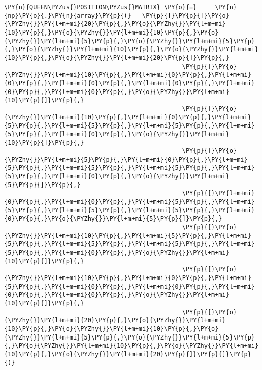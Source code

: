 \begin{Verbatim}[commandchars=\\\{\}]
         \PY{n}{QUEEN\PYZus{}POSITION\PYZus{}MATRIX} \PY{o}{=}     \PY{n}{np}\PY{o}{.}\PY{n}{array}\PY{p}{(}   \PY{p}{[}\PY{p}{[}\PY{o}{\PYZhy{}}\PY{l+m+mi}{20}\PY{p}{,}\PY{o}{\PYZhy{}}\PY{l+m+mi}{10}\PY{p}{,}\PY{o}{\PYZhy{}}\PY{l+m+mi}{10}\PY{p}{,}\PY{o}{\PYZhy{}}\PY{l+m+mi}{5}\PY{p}{,}\PY{o}{\PYZhy{}}\PY{l+m+mi}{5}\PY{p}{,}\PY{o}{\PYZhy{}}\PY{l+m+mi}{10}\PY{p}{,}\PY{o}{\PYZhy{}}\PY{l+m+mi}{10}\PY{p}{,}\PY{o}{\PYZhy{}}\PY{l+m+mi}{20}\PY{p}{]}\PY{p}{,}
                                                 \PY{p}{[}\PY{o}{\PYZhy{}}\PY{l+m+mi}{10}\PY{p}{,}\PY{l+m+mi}{0}\PY{p}{,}\PY{l+m+mi}{0}\PY{p}{,}\PY{l+m+mi}{0}\PY{p}{,}\PY{l+m+mi}{0}\PY{p}{,}\PY{l+m+mi}{0}\PY{p}{,}\PY{l+m+mi}{0}\PY{p}{,}\PY{o}{\PYZhy{}}\PY{l+m+mi}{10}\PY{p}{]}\PY{p}{,}
                                                 \PY{p}{[}\PY{o}{\PYZhy{}}\PY{l+m+mi}{10}\PY{p}{,}\PY{l+m+mi}{0}\PY{p}{,}\PY{l+m+mi}{5}\PY{p}{,}\PY{l+m+mi}{5}\PY{p}{,}\PY{l+m+mi}{5}\PY{p}{,}\PY{l+m+mi}{5}\PY{p}{,}\PY{l+m+mi}{0}\PY{p}{,}\PY{o}{\PYZhy{}}\PY{l+m+mi}{10}\PY{p}{]}\PY{p}{,}
                                                 \PY{p}{[}\PY{o}{\PYZhy{}}\PY{l+m+mi}{5}\PY{p}{,}\PY{l+m+mi}{0}\PY{p}{,}\PY{l+m+mi}{5}\PY{p}{,}\PY{l+m+mi}{5}\PY{p}{,}\PY{l+m+mi}{5}\PY{p}{,}\PY{l+m+mi}{5}\PY{p}{,}\PY{l+m+mi}{0}\PY{p}{,}\PY{o}{\PYZhy{}}\PY{l+m+mi}{5}\PY{p}{]}\PY{p}{,}
                                                 \PY{p}{[}\PY{l+m+mi}{0}\PY{p}{,}\PY{l+m+mi}{0}\PY{p}{,}\PY{l+m+mi}{5}\PY{p}{,}\PY{l+m+mi}{5}\PY{p}{,}\PY{l+m+mi}{5}\PY{p}{,}\PY{l+m+mi}{5}\PY{p}{,}\PY{l+m+mi}{0}\PY{p}{,}\PY{o}{\PYZhy{}}\PY{l+m+mi}{5}\PY{p}{]}\PY{p}{,}
                                                 \PY{p}{[}\PY{o}{\PYZhy{}}\PY{l+m+mi}{10}\PY{p}{,}\PY{l+m+mi}{5}\PY{p}{,}\PY{l+m+mi}{5}\PY{p}{,}\PY{l+m+mi}{5}\PY{p}{,}\PY{l+m+mi}{5}\PY{p}{,}\PY{l+m+mi}{5}\PY{p}{,}\PY{l+m+mi}{0}\PY{p}{,}\PY{o}{\PYZhy{}}\PY{l+m+mi}{10}\PY{p}{]}\PY{p}{,}
                                                 \PY{p}{[}\PY{o}{\PYZhy{}}\PY{l+m+mi}{10}\PY{p}{,}\PY{l+m+mi}{0}\PY{p}{,}\PY{l+m+mi}{5}\PY{p}{,}\PY{l+m+mi}{0}\PY{p}{,}\PY{l+m+mi}{0}\PY{p}{,}\PY{l+m+mi}{0}\PY{p}{,}\PY{l+m+mi}{0}\PY{p}{,}\PY{o}{\PYZhy{}}\PY{l+m+mi}{10}\PY{p}{]}\PY{p}{,}
                                                 \PY{p}{[}\PY{o}{\PYZhy{}}\PY{l+m+mi}{20}\PY{p}{,}\PY{o}{\PYZhy{}}\PY{l+m+mi}{10}\PY{p}{,}\PY{o}{\PYZhy{}}\PY{l+m+mi}{10}\PY{p}{,}\PY{o}{\PYZhy{}}\PY{l+m+mi}{5}\PY{p}{,}\PY{o}{\PYZhy{}}\PY{l+m+mi}{5}\PY{p}{,}\PY{o}{\PYZhy{}}\PY{l+m+mi}{10}\PY{p}{,}\PY{o}{\PYZhy{}}\PY{l+m+mi}{10}\PY{p}{,}\PY{o}{\PYZhy{}}\PY{l+m+mi}{20}\PY{p}{]}\PY{p}{]}\PY{p}{)}
         

\end{Verbatim}
